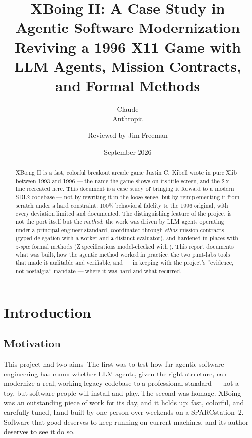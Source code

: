 \documentclass[11pt,a4paper]{article}
\title{%
    \textbf{XBoing II: A Case Study in Agentic Software Modernization}\\[0.5em]
    \large Reviving a 1996 X11 Game with LLM Agents, Mission Contracts,\\
    \large and Formal Methods
}
\author{Claude \\ \small Anthropic \and Reviewed by Jim Freeman}
\date{September 2026}
\begin{document}
\maketitle
\sloppy %

\begin{abstract}
\noindent
XBoing II is a fast, colorful breakout arcade game Justin C.\ Kibell wrote in
pure Xlib between 1993 and 1996 --- the name the game shows on its title
screen, and the 2.x line recreated here. This document is a case study of
bringing it forward to a modern SDL2 codebase --- not by rewriting it in the
loose
sense, but by reimplementing it from scratch under a hard constraint:
100\% behavioral fidelity to the 1996 original, with every deviation
limited and documented. The distinguishing feature of the project is not
the port itself but the \emph{method}: the work was driven by LLM agents
operating under a principal-engineer standard, coordinated through
\emph{ethos} mission contracts (typed delegation with a worker and a
distinct evaluator), and hardened in places with \emph{z-spec} formal
methods (Z specifications model-checked with ). This report
documents what was built, how the agentic method worked in practice, the
two punt-labs tools that made it auditable and verifiable, and --- in
keeping with the project's ``evidence, not nostalgia'' mandate --- where
it was hard and what recurred.
\end{abstract}

\tableofcontents
\newpage

\section{Introduction}

\subsection{Motivation}

This project had two aims. The first was to test how far agentic software
engineering has come: whether LLM agents, given the right structure, can
modernize a real, working legacy codebase to a professional standard ---
not a toy, but software people will install and play. The second was homage.
XBoing was an outstanding piece of work for its day, and it holds up: fast,
colorful, and carefully tuned, hand-built by one person over weekends on a
SPARCstation~2. Software that good deserves to keep running on current
machines, and its author deserves to see it do so.
\end{document}

